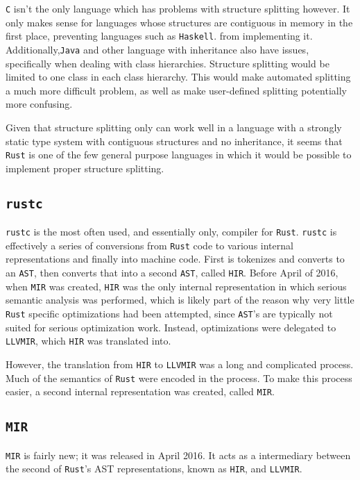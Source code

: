 \documentclass[prodmode,acmtecs]{acmsmall} %
\newcommand{\rustname}{{\texttt{Rust}}}
\def \rust {\rustname{}\xspace}
\newcommand{\rustcname}{{\texttt{rustc}}}
\def \rustc {\rustcname{}\xspace}
\newcommand{\cname}{{\texttt{C}}}
\def \c {\cname{}\xspace}
\newcommand{\mirname}{{\texttt{MIR}}}
\def \mir {\mirname{}\xspace}
\newcommand{\hirname}{{\texttt{HIR}}}
\def \hir {\hirname{}\xspace}
\newcommand{\llvmirname}{{\texttt{LLVMIR}}}
\def \llvmir {\llvmirname{}\xspace}
\begin{document}
\c isn't the only language which has problems with structure splitting
however. It only makes sense for languages whose structures are contiguous
in memory in the first place, preventing languages such as \texttt{Haskell}.
from implementing it.  Additionally,\texttt{Java} and 
other language with inheritance also
have issues, specifically when dealing with class hierarchies. Structure
splitting would be limited to one class in each class hierarchy. This would
make automated splitting a much more difficult problem, as well as 
make user-defined splitting potentially more confusing.

Given that structure splitting only can work well in a language with
a strongly static type system with contiguous structures and no inheritance,
it seems that \rust is one of the few general purpose languages in which
it would be possible to implement proper structure splitting.

\subsection{\rustc}
\label{sec:rustc}

\rustc is the most often used, and essentially only, compiler for \rust.
\rustc is effectively a series of conversions from
\rust code to various internal representations and finally into machine code.
First is tokenizes and converts to an \texttt{AST}, then converts that into a
second \texttt{AST}, called \hir. Before April of 2016, when \mir was created,
\hir was the only
internal representation in which serious semantic analysis was performed, which
is likely part of the reason why very little \rust specific optimizations had
been attempted, since \texttt{AST}'s are typically not suited for serious
optimization work. Instead, optimizations were delegated to \llvmir, which \hir
was translated into.

However, the translation from \hir to \llvmir was a long and complicated process.
Much of the semantics of \rust were encoded in the process. To make this 
process easier, a second internal representation was created, called \mir.	


\subsection{\mir}
\mir is fairly new; it was released in April 2016\cite{mirintro}. It acts as a
intermediary between the second of \rust's AST representations, known as \hir,
and \llvmir.
\end{document}
